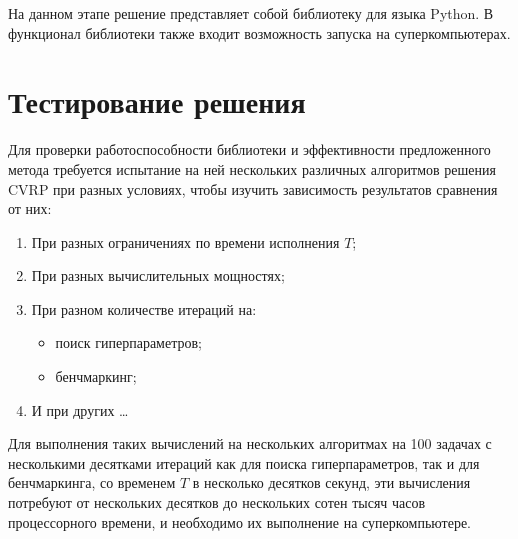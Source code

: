 \documentclass[a4paper,12pt]{article}
\begin{document}
На данном этапе решение представляет собой библиотеку для языка Python.
В функционал библиотеки также входит возможность запуска на суперкомпьютерах.

\section*{Тестирование решения}
Для проверки работоспособности библиотеки и эффективности предложенного метода требуется испытание на ней нескольких различных алгоритмов решения CVRP при разных условиях, чтобы изучить зависимость результатов сравнения от них:

\begin{enumerate}
    \item При разных ограничениях по времени исполнения $T$;
    \item При разных вычислительных мощностях;
    \item При разном количестве итераций на:
    \begin{itemize}
        \item поиск гиперпараметров;
        \item бенчмаркинг;
    \end{itemize}
    \item[] И при других \dots
\end{enumerate}

Для выполнения таких вычислений на нескольких алгоритмах на 100 задачах с несколькими десятками итераций как для поиска гиперпараметров, так и для бенчмаркинга, со временем $T$ в несколько десятков секунд, эти вычисления потребуют от  нескольких десятков до нескольких сотен тысяч часов  процессорного времени, и необходимо их выполнение на  суперкомпьютере.

\printbibliography
\end{document}

